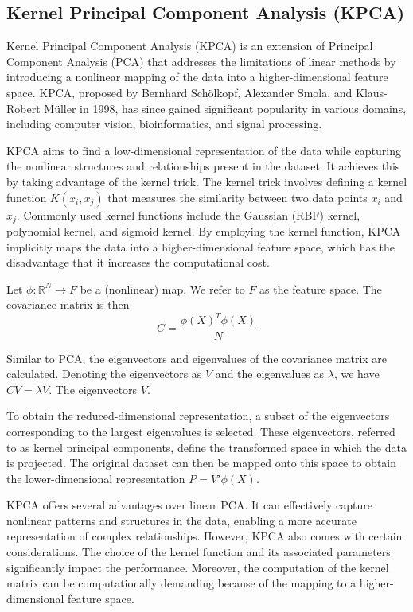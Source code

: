\subsection{Kernel Principal Component Analysis (KPCA)}
Kernel Principal Component Analysis (KPCA) is an extension of Principal Component Analysis (PCA) that addresses the limitations of linear methods by introducing a nonlinear mapping of the data into a higher-dimensional feature space. KPCA, proposed by Bernhard Schölkopf, Alexander Smola, and Klaus-Robert Müller in 1998, has since gained significant popularity in various domains, including computer vision, bioinformatics, and signal processing.

KPCA aims to find a low-dimensional representation of the data while capturing the nonlinear structures and relationships present in the dataset. It achieves this by taking advantage of the kernel trick. The kernel trick involves defining a kernel function $K(x_i, x_j)$ that measures the similarity between two data points $x_i$ and $x_j$. Commonly used kernel functions include the Gaussian (RBF) kernel, polynomial kernel, and sigmoid kernel. By employing the kernel function, KPCA implicitly maps the data into a higher-dimensional feature space, which has the disadvantage that it increases the computational cost.

Let $\phi : \mathbb{R}^N \rightarrow F$ be a (nonlinear) map. We refer to $F$ as the feature space. The covariance matrix is then
\begin{equation}
    C = \frac{\phi(X)^T \phi(X)}{N}
\end{equation}

Similar to PCA, the eigenvectors and eigenvalues of the covariance matrix are calculated. Denoting the eigenvectors as $V$ and the eigenvalues as $\lambda$, we have $C V = \lambda V$. The eigenvectors $V$.

To obtain the reduced-dimensional representation, a subset of the eigenvectors corresponding to the largest eigenvalues is selected. These eigenvectors, referred to as kernel principal components, define the transformed space in which the data is projected. The original dataset can then be mapped onto this space to obtain the lower-dimensional representation $P = V' \phi(X)$.

KPCA offers several advantages over linear PCA. It can effectively capture nonlinear patterns and structures in the data, enabling a more accurate representation of complex relationships.
However, KPCA also comes with certain considerations. The choice of the kernel function and its associated parameters significantly impact the performance. Moreover, the computation of the kernel matrix can be computationally demanding because of the mapping to a higher-dimensional feature space.

